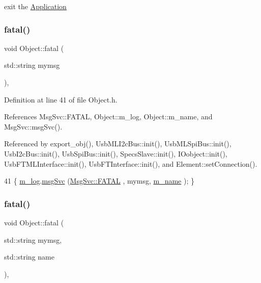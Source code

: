 exit the \hyperlink{classApplication}{Application} \mbox{\label{classObject_aad5a16aac7516ce65bd5ec02ab07fc80}} 
\subsubsection{\texorpdfstring{fatal()}{fatal()}\hspace{0.1cm}{\footnotesize\ttfamily [1/2]}}
{\footnotesize\ttfamily void Object\+::fatal (\begin{DoxyParamCaption}\item[{std\+::string}]{mymsg }\end{DoxyParamCaption})\hspace{0.3cm}{\ttfamily [inline]}, {\ttfamily [inherited]}}



Definition at line 41 of file Object.\+h.



References Msg\+Svc\+::\+F\+A\+T\+AL, Object\+::m\+\_\+log, Object\+::m\+\_\+name, and Msg\+Svc\+::msg\+Svc().



Referenced by export\+\_\+obj(), Usb\+M\+L\+I2c\+Bus\+::init(), Usb\+M\+L\+Spi\+Bus\+::init(), Usb\+I2c\+Bus\+::init(), Usb\+Spi\+Bus\+::init(), Specs\+Slave\+::init(), I\+Oobject\+::init(), Usb\+F\+T\+M\+L\+Interface\+::init(), Usb\+F\+T\+Interface\+::init(), and Element\+::set\+Connection().


\begin{DoxyCode}
41 \{ \hyperlink{classObject_a0d269813dd7ac1f24bc143031e2963f2}{m\_log}.\hyperlink{classMsgSvc_ad25f18047920cc59a314e5098259711c}{msgSvc} (\hyperlink{classMsgSvc_ae671eb7301996cd049d2da8a65925926a59c73cb29edfc9cdf35845e2b1301363}{MsgSvc::FATAL}   , mymsg, \hyperlink{classObject_a8b83c95c705d2c3ba0d081fe1710f48d}{m\_name} ); \}
\end{DoxyCode}
\mbox{\label{classObject_ae62acd3d09f716220f75f252dc38bc9a}} 
\subsubsection{\texorpdfstring{fatal()}{fatal()}\hspace{0.1cm}{\footnotesize\ttfamily [2/2]}}
{\footnotesize\ttfamily void Object\+::fatal (\begin{DoxyParamCaption}\item[{std\+::string}]{mymsg,  }\item[{std\+::string}]{name }\end{DoxyParamCaption})\hspace{0.3cm}{\ttfamily [inline]}, {\ttfamily [inherited]}}



